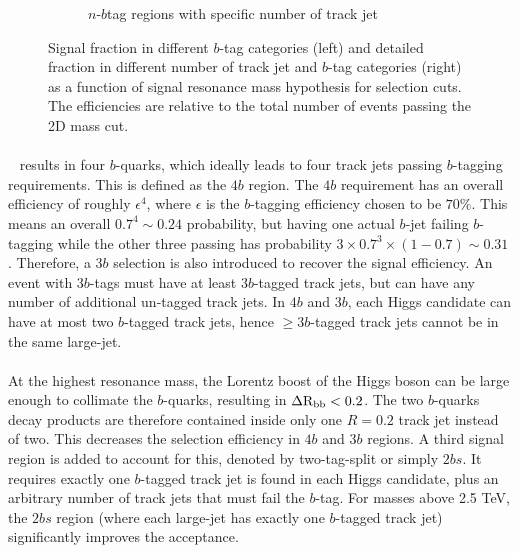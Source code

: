 \begin{figure}[htbp!]
\begin{subfigure}[b]{0.45\textwidth}
        \caption{$n$-$b$tag regions with specific number of track jet}
        \label{fig:boosted-nbjet-signal-efficiency-detail}
    \end{subfigure}
  \caption{Signal fraction in different $b$-tag categories (left) and detailed fraction in different number of track jet and $b$-tag categories (right) as a function of signal resonance mass hypothesis for selection cuts. The efficiencies are relative to the total number of events passing the 2D mass cut.}
  \label{fig:boosted-nbjet-signal-efficiency}
\end{figure}

\paragraph{}
\Xtohhb~ results in four $b$-quarks, which ideally leads to four track jets passing $b$-tagging requirements.
This is defined as the $4b$ region.
The $4b$ requirement has an overall efficiency of roughly $\epsilon^4$, where $\epsilon$ is the $b$-tagging efficiency chosen to be $70\%$.
This means an overall $0.7^4 \sim 0.24$ probability, but having one actual $b$-jet failing $b$-tagging while the other three passing has probability $3 \times 0.7^3 \times (1-0.7) \sim 0.31$.
Therefore, a $3b$ selection is also introduced to recover the signal efficiency. 
An event with $3b$-tags must have at least $3b$-tagged track jets, but can have any number of additional un-tagged track jets.
In $4b$ and $3b$, each Higgs candidate can have at most two $b$-tagged track jets, hence $\geq 3b$-tagged track jets cannot be in the same large-\R jet.

\paragraph{}
At the highest resonance mass, the Lorentz boost of the Higgs boson can be large enough to collimate the $b$-quarks, resulting in $\rm \Delta R_{bb} < 0.2$.
The two $b$-quarks decay products are therefore contained inside only one $R = 0.2$ track jet instead of two.
This decreases the selection efficiency in $4b$ and $3b$ regions.
A third signal region is added to account for this, denoted by two-tag-split or simply $2bs$.
It requires exactly one $b$-tagged track jet is found in each Higgs candidate, plus an arbitrary number of track jets that must fail the $b$-tag.
For masses above 2.5 TeV, the $2bs$ region (where each large-\R jet has exactly one $b$-tagged track jet) significantly improves the acceptance.

